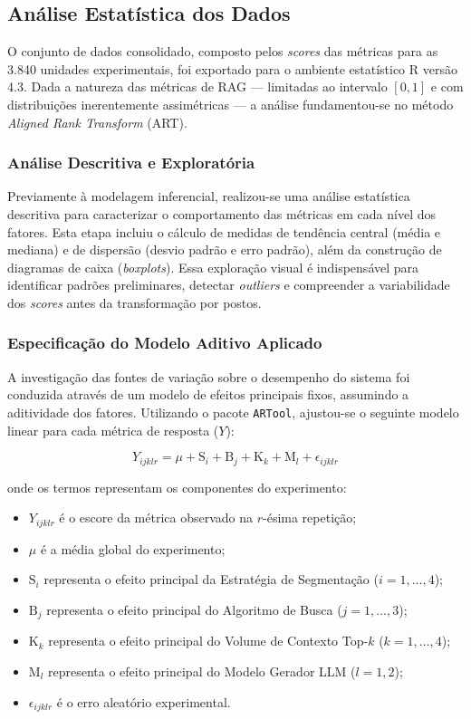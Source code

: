 \subsection{Análise Estatística dos Dados}

O conjunto de dados consolidado, composto pelos \textit{scores} das métricas para as 3.840 unidades experimentais, foi exportado para o ambiente estatístico R versão 4.3. Dada a natureza das métricas de RAG — limitadas ao intervalo $[0, 1]$ e com distribuições inerentemente assimétricas — a análise fundamentou-se no método \textit{Aligned Rank Transform} (ART).

\subsubsection{Análise Descritiva e Exploratória}

Previamente à modelagem inferencial, realizou-se uma análise estatística descritiva para caracterizar o comportamento das métricas em cada nível dos fatores. Esta etapa incluiu o cálculo de medidas de tendência central (média e mediana) e de dispersão (desvio padrão e erro padrão), além da construção de diagramas de caixa (\textit{boxplots}). Essa exploração visual é indispensável para identificar padrões preliminares, detectar \textit{outliers} e compreender a variabilidade dos \textit{scores} antes da transformação por postos.

\subsubsection{Especificação do Modelo Aditivo Aplicado}

A investigação das fontes de variação sobre o desempenho do sistema foi conduzida através de um modelo de efeitos principais fixos, assumindo a aditividade dos fatores. Utilizando o pacote \texttt{ARTool}, ajustou-se o seguinte modelo linear para cada métrica de resposta ($Y$):

\begin{equation}
  Y_{ijklr} = \mu + \text{S}_{i} + \text{B}_{j} + \text{K}_{k} + \text{M}_{l} + \epsilon_{ijklr}
\end{equation}

\noindent onde os termos representam os componentes do experimento:
\begin{itemize}
  \item $Y_{ijklr}$ é o escore da métrica observado na $r$-ésima repetição;
  \item $\mu$ é a média global do experimento;
  \item $\text{S}_{i}$ representa o efeito principal da Estratégia de Segmentação ($i=1, \dots, 4$);
  \item $\text{B}_{j}$ representa o efeito principal do Algoritmo de Busca ($j=1, \dots, 3$);
  \item $\text{K}_{k}$ representa o efeito principal do Volume de Contexto Top-$k$ ($k=1, \dots, 4$);
  \item $\text{M}_{l}$ representa o efeito principal do Modelo Gerador LLM ($l=1, 2$);
  \item $\epsilon_{ijklr}$ é o erro aleatório experimental.
\end{itemize}

